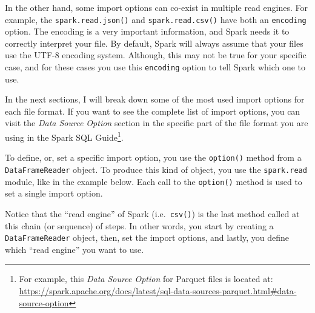 \documentclass[
  11pt,
  letterpaper,
  DIV=11,
  numbers=noendperiod]{scrreprt}
\newenvironment{Shaded}{\begin{snugshade}}{\end{snugshade}}
\newcommand{\CommentTok}[1]{\textcolor[rgb]{0.37,0.37,0.37}{#1}}
\newcommand{\NormalTok}[1]{\textcolor[rgb]{0.00,0.23,0.31}{#1}}
\newcommand{\OperatorTok}[1]{\textcolor[rgb]{0.37,0.37,0.37}{#1}}
\newcommand{\StringTok}[1]{\textcolor[rgb]{0.13,0.47,0.30}{#1}}
\begin{document}
In the other hand, some import options can co-exist in multiple read
engines. For example, the \texttt{spark.read.json()} and
\texttt{spark.read.csv()} have both an \texttt{encoding} option. The
encoding is a very important information, and Spark needs it to
correctly interpret your file. By default, Spark will always assume that
your files use the UTF-8 encoding system. Although, this may not be true
for your specific case, and for these cases you use this
\texttt{encoding} option to tell Spark which one to use.

In the next sections, I will break down some of the most used import
options for each file format. If you want to see the complete list of
import options, you can visit the \emph{Data Source Option} section in
the specific part of the file format you are using in the Spark SQL
Guide\footnote{For example, this \emph{Data Source Option} for Parquet
  files is located at:
  \url{https://spark.apache.org/docs/latest/sql-data-sources-parquet.html\#data-source-option}}.

To define, or, set a specific import option, you use the
\texttt{option()} method from a \texttt{DataFrameReader} object. To
produce this kind of object, you use the \texttt{spark.read} module,
like in the example below. Each call to the \texttt{option()} method is
used to set a single import option.

Notice that the ``read engine'' of Spark (i.e.~\texttt{csv()}) is the
last method called at this chain (or sequence) of steps. In other words,
you start by creating a \texttt{DataFrameReader} object, then, set the
import options, and lastly, you define which ``read engine'' you want to
use.

\begin{Shaded}
\end{Shaded}
\end{document}
